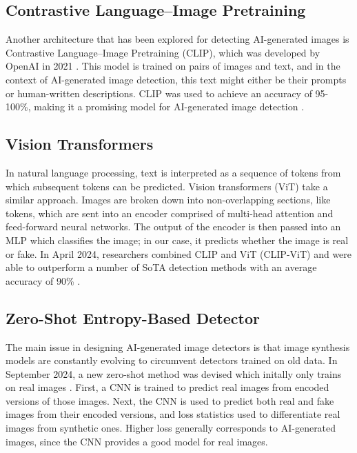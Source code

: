 \documentclass{article} %
\begin{document}
\subsection{Contrastive Language–Image Pretraining}

Another architecture that has been explored for detecting AI-generated images is Contrastive Language–Image Pretraining (CLIP), which was developed by OpenAI in 2021 \citep{radford2021learningtransferablevisualmodels}. This model is trained on pairs of images and text, and in the context of AI-generated image detection, this text might either be their prompts or human-written descriptions. CLIP was used to achieve an accuracy of 95-100\%, making it a promising model for AI-generated image detection \citep{moskowitz2024detectingaigeneratedimagesclip}.

\subsection{Vision Transformers}

In natural language processing, text is interpreted as a sequence of tokens from which subsequent tokens can be predicted. Vision transformers (ViT) take a similar approach. Images are broken down into non-overlapping sections, like tokens, which are sent into an encoder comprised of multi-head attention and feed-forward neural networks. The output of the encoder is then passed into an MLP which classifies the image; in our case, it predicts whether the image is real or fake. In April 2024, researchers combined CLIP and ViT (CLIP-ViT) and were able to outperform a number of SoTA detection methods with an average accuracy of 90\% \citep{cozzolino2024raisingbaraigeneratedimage}.

\subsection{Zero-Shot Entropy-Based Detector}
\label{ZED}

The main issue in designing AI-generated image detectors is that image synthesis models are constantly evolving to circumvent detectors trained on old data. In September 2024, a new zero-shot method was devised which initally only trains on real images \citep{cozzolino2024zeroshotdetectionaigeneratedimages}. First, a CNN is trained to predict real images from encoded versions of those images. Next, the CNN is used to predict both real and fake images from their encoded versions, and loss statistics used to differentiate real images from synthetic ones. Higher loss generally corresponds to AI-generated images, since the CNN provides a good model for real images.
\end{document}

